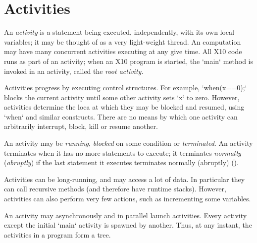 \chapter{Activities}\label{XtenActivities}


An {\em activity} is a statement being executed, independently, with its own
local variables; it may be thought of as a very light-weight thread. An
\Xten{} computation may have many concurrent {activities} executing at any
give time.  All X10 code runs as part of an activity; when an X10 program is
started, the \xcd`main` method is invoked in an activity, called the {\em root
activity}.


Activities progress by executing control structures. %
For example, 
\xcd`when(x==0);` blocks the current activity until some other activity
sets \xcd`x` to zero.  However, activities determine the loca at which they
may be blocked and resumed, using \xcd`when` and similar constructs.  There are
no means by which one activity can arbitrarily interrupt, block, kill or resume
another.


An activity may be {\em running}, {\em blocked} on some condition or {\em
terminated}. An activity terminates when it has no more statements to
execute; it terminates {\em normally} ({\em abruptly}) if the last statement it
executes terminates normally (abruptly) ().

Activities can be long-running, and may access a lot of data.  In
particular they can call recursive methods (and therefore have runtime
stacks).  However, activities can also perform very few actions, such
as incrementing some variables. 

An activity may asynchronously and in parallel launch activities.
Every activity except the initial \xcd`main` activity is spawned
by another.  Thus, at any instant, the activities in a program form a tree.

